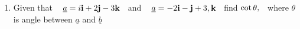 \documentclass[11pt,a4paper]{article}
\begin{document}
\begin{enumerate}
\begin{enumerate}
      \item Given that $\hspace{0.3cm} \underline{a} = i\textbf{i} + 2\textbf{j} - 3\textbf{k}\hspace{0.2cm}$ and $\hspace{0.3cm} \underline{a} = -2\textbf{i} - \textbf{j} + 3,\textbf{k}\hspace{0.2cm}$ find $\cot \theta,\hspace{0.2cm}$ where  $\theta$ is angle between $\underline{a}$ and $\underline{b}$\\\\ 
\end{enumerate}
\end{enumerate}
\end{document}
